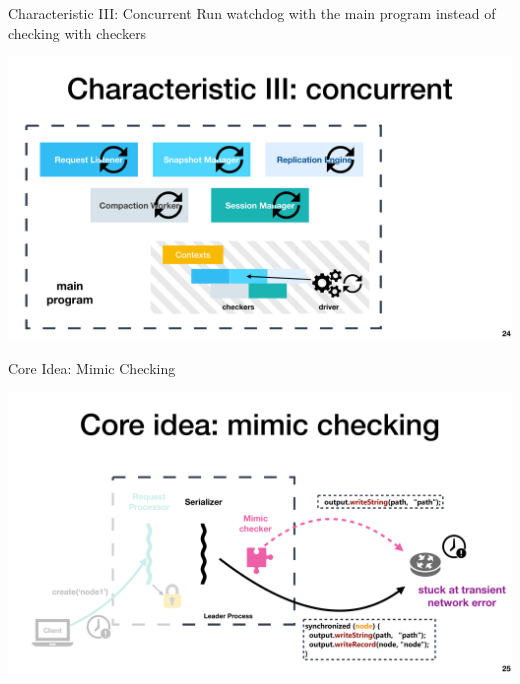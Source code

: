 \documentclass[aspectratio=169]{beamer}
\newcommand{\red}[1]{{\color{red}{#1}}}
\newcommand{\blue}[1]{{\color{blue}{#1}}}
\begin{document}
\begin{frame}{Characteristic III: Concurrent}
    Run watchdog \red{concurrently} with the main program instead of \blue{in-place} checking with \blue{inserted} checkers
    \begin{center}
        \includegraphics[width=.75
        \textwidth]{fig/concurrent}
    \end{center}
\end{frame}

\begin{frame}{Core Idea: Mimic Checking}
    \begin{center}
        \includegraphics[width=.75\textwidth]{fig/mimic}
    \end{center}
\end{frame}
\end{document}
